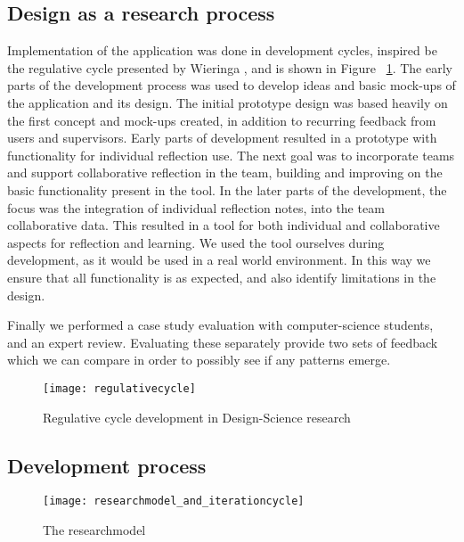 \subsection{Design as a research process}
Implementation of the application was done in development cycles, inspired be the regulative cycle presented by Wieringa \citep{wieringa}, and is shown in Figure ~\ref{regulativecycle}. 
The early parts of the development process was used to develop ideas and basic mock-ups of the application and its design. The initial prototype design was based heavily on the first concept and mock-ups created, in addition to recurring feedback from users and supervisors. Early parts of development resulted in a prototype with functionality for individual reflection use. The next goal was to incorporate teams and support collaborative reflection in the team, building and improving on the basic functionality present in the tool. In the later parts of the development, the focus was the integration of individual reflection notes, into the team collaborative data. This resulted in a tool for both individual and collaborative aspects for reflection and learning. We used the tool ourselves during development, as it would be used in a real world environment. In this way we ensure that all functionality is as expected, and also identify limitations in the design. 

Finally we performed a case study evaluation with computer-science students, and an expert review. Evaluating these separately provide two sets of feedback which we can compare in order to possibly see if any patterns emerge. 
\begin{figure}[!htpb]
\centering
	\texttt{[image: regulativecycle]}
\caption{Regulative cycle development in Design-Science research}
\label{regulativecycle}
\end{figure}

\subsection{Development process}
\begin{figure}[!htpb]
\centering
	\texttt{[image: researchmodel\_and\_iterationcycle]}
\caption{The researchmodel}
\label{researchmodel}
\end{figure}

